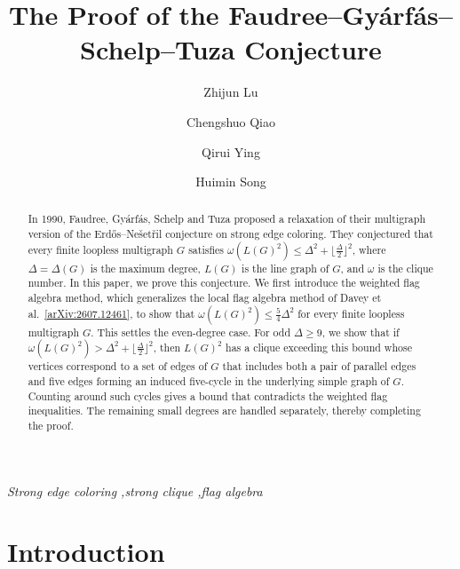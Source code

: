 \documentclass[preprint,11pt,numbers]{elsarticle-arxiv}
\numberwithin{equation}{section}
\theoremstyle{definition}
\newcommand{\papertitle}{The Proof of the Faudree--Gy\'arf\'as--Schelp--Tuza Conjecture}
\begin{document}

\begin{frontmatter}
\title{\textbf{\Large\papertitle}}
\author[1]{Zhijun Lu}
\author[1]{Chengshuo Qiao}
\author[1]{Qirui Ying}
\author[1]{Huimin Song}

\begin{abstract}
In 1990, Faudree, Gy\'arf\'as, Schelp and Tuza proposed a relaxation
of their multigraph version of the Erd\H{o}s--Ne\v{s}et\v{r}il conjecture
on strong edge coloring. They conjectured that every
finite loopless multigraph $G$ satisfies
$\omega(L(G)^2)\leq\Delta^2+\lfloor\frac{\Delta}{2}\rfloor^2$, where
$\Delta=\Delta(G)$ is the maximum degree, $L(G)$ is the line graph
of $G$, and $\omega$ is the clique number. In this paper, we prove
this conjecture. We first introduce the weighted flag algebra method,
which generalizes the local flag algebra method of
Davey et al.~\href{https://arxiv.org/abs/2607.12461}{[arXiv:2607.12461]},
to show that $\omega(L(G)^2)\leq\frac{5}{4}\Delta^2$ for every finite loopless
multigraph $G$. This settles the even-degree case.
For odd $\Delta\geq 9$, we show that if
$\omega(L(G)^2)>\Delta^2+\lfloor\frac{\Delta}{2}\rfloor^2$,
then $L(G)^2$ has a clique exceeding this bound whose vertices
correspond to a set of edges of $G$ that includes both a pair of
parallel edges and five edges forming an induced five-cycle in the
underlying simple graph of $G$. Counting around such cycles gives a
bound that contradicts the weighted flag inequalities. The remaining
small degrees are handled separately, thereby completing the proof.
\end{abstract}
\begin{keyword}
\textit{Strong edge coloring \sep strong clique \sep flag algebra}
\end{keyword}
\end{frontmatter}

\thispagestyle{plain}
\tableofcontents
\clearpage
\section{Introduction}\label{sec:intro}
\end{document}

